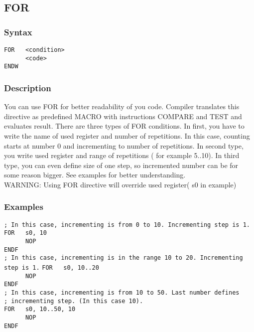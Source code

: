     \subsection{FOR}
        \subsubsection{Syntax}
            \verb'FOR   <condition>'\\
            \verb'      <code>'\\
            \verb'ENDW'

        \subsubsection{Description}
            You can use FOR for better readability of you code. Compiler translates this directive as predefined MACRO with instructions COMPARE and TEST and evaluates result. There are three types of FOR conditions. In first, you have to write the name of used register and number of repetitions. In this case, counting starts at number 0 and incrementing to number of repetitions. In second type, you write used register and range of repetitions ( for example 5..10). In third type, you can even define size of one step, so incremented number can be for some reason bigger. See examples for better understanding.\\ WARNING: Using FOR directive will override used register( s0 in example)

        \subsubsection{Examples}
            \verb'; In this case, incrementing is from 0 to 10. Incrementing step is 1.'
            \verb'FOR   s0, 10'\\
            \verb'      NOP'\\
            \verb'ENDF'
            \verb''\\
            \verb'; In this case, incrementing is in the range 10 to 20. Incrementing step is 1.'
            \verb'FOR   s0, 10..20'\\
            \verb'      NOP'\\
            \verb'ENDF'
            \verb''\\
            \verb'; In this case, incrementing is from 10 to 50. Last number defines'\\
            \verb'; incrementing step. (In this case 10).'\\
            \verb'FOR   s0, 10..50, 10'\\
            \verb'      NOP'\\
            \verb'ENDF'

